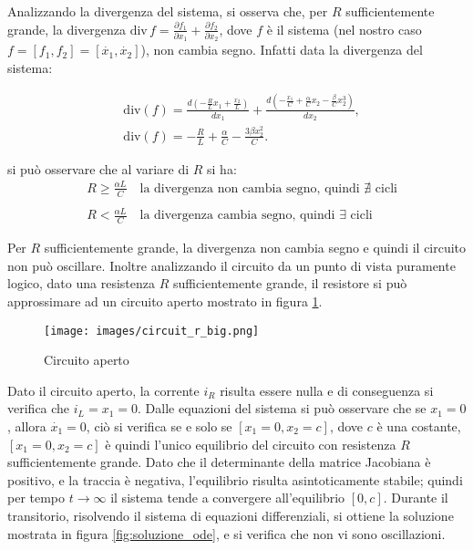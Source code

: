 \documentclass{article}
\begin{document}
Analizzando la divergenza del sistema, si osserva che, per \(R\) sufficientemente grande, la divergenza \(\text{div}\,f = \frac{\partial f_1}{\partial x_1} + \frac{\partial f_2}{\partial x_2}\), dove \(f\) è il sistema (nel nostro caso \(f = [f_1, f_2] = [\dot{x_1}, \dot{x_2}]\)), non cambia segno. Infatti data la divergenza del sistema:

\begin{align*}
     & \text{div}(f) = \frac{d(-\frac{R}{L}x_1 + \frac{x_2}{L})}{dx_1} + \frac{d(-\frac{x_1}{C} + \frac{\alpha}{C}x_2 - \frac{\beta}{C}x_2^3)}{dx_2}, \\
     & \text{div}(f) = -\frac{R}{L} + \frac{\alpha}{C} - \frac{3\beta x_2^2}{C}.
\end{align*}

si può osservare che al variare di \(R\) si ha:
\begin{align*}
     & R \geq \frac{\alpha L}{C} \hspace{1em} \text{la divergenza non cambia segno, quindi } \nexists \text{ cicli} \\\\
     & R < \frac{\alpha L}{C} \hspace{1em} \text{la divergenza cambia segno, quindi } \exists \text{ cicli}
\end{align*}

Per \(R\) sufficientemente grande, la divergenza non cambia segno e quindi il circuito non può oscillare.
Inoltre analizzando il circuito da un punto di vista puramente logico, dato una resistenza \(R\) sufficientemente grande, il resistore si può approssimare ad un circuito aperto mostrato in figura \ref{fig:circuito_aperto}.

\begin{figure}[ht]
    \texttt{[image: images/circuit\_r\_big.png]}
    \caption{Circuito aperto}
    \label{fig:circuito_aperto}
\end{figure}

Dato il circuito aperto, la corrente \(i_R\) risulta essere nulla e di conseguenza si verifica che \(i_L = x_1 = 0\). Dalle equazioni del sistema si può osservare che se \(x_1 = 0\), allora \(\dot{x_1} = 0\), ciò si verifica se e solo se \([x_1 = 0, x_2 = c]\), dove \(c\) è una costante, \([x_1 = 0, x_2 = c]\) è quindi l'unico equilibrio del circuito con resistenza \(R\) sufficientemente grande. Dato che il determinante della matrice Jacobiana è positivo, e la traccia è negativa, l'equilibrio risulta asintoticamente stabile; quindi per tempo \(t \to \infty\) il sistema tende a convergere all'equilibrio \([0, c]\). Durante il transitorio, risolvendo il sistema di equazioni differenziali, si ottiene la soluzione mostrata in figura \ref{fig:soluzione_ode}, e si verifica che non vi sono oscillazioni.
\end{document}

